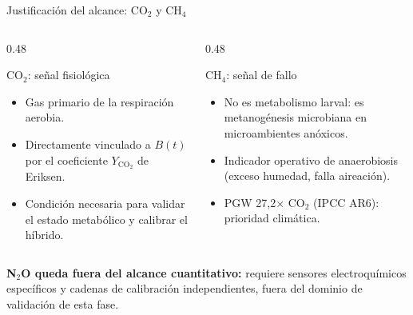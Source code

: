 \documentclass[aspectratio=169, 11pt]{beamer}
\begin{document}
\begin{frame}{Justificaci\'{o}n del alcance: CO$_2$ y CH$_4$}
    \begin{columns}[T]
        \begin{column}{0.48\textwidth}
            \begin{block}{CO$_2$: se\~{n}al fisiol\'{o}gica}
                \begin{itemize}
                    \item Gas primario de la respiraci\'{o}n aerobia.
                    \item Directamente vinculado a $B(t)$ por el coeficiente $Y_{\text{CO}_2}$ de Eriksen.
                    \item Condici\'{o}n necesaria para validar el estado metab\'{o}lico y calibrar el h\'{i}brido.
                \end{itemize}
            \end{block}
        \end{column}
        \begin{column}{0.48\textwidth}
            \begin{alertblock}{CH$_4$: se\~{n}al de fallo}
                \begin{itemize}
                    \item No es metabolismo larval: es metanog\'{e}nesis microbiana en microambientes an\'{o}xicos.
                    \item Indicador operativo de anaerobiosis (exceso humedad, falla aireaci\'{o}n).
                    \item PGW 27,2$\times$ CO$_2$ (IPCC AR6): prioridad clim\'{a}tica.
                \end{itemize}
            \end{alertblock}
        \end{column}
    \end{columns}

    \vfill
    \begin{center}
        \textbf{N$_2$O queda fuera del alcance cuantitativo:} requiere sensores electroqu\'{i}micos espec\'{i}ficos y cadenas de calibraci\'{o}n independientes, fuera del dominio de validaci\'{o}n de esta fase.
    \end{center}
\end{frame}
\end{document}
